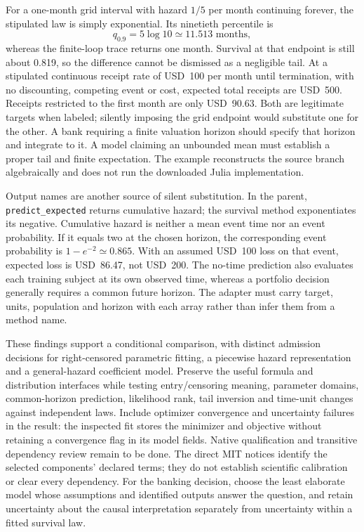 For a one-month grid interval with hazard $1/5$ per month continuing forever,
the stipulated law is simply exponential. Its ninetieth percentile is
\begin{equation}
 q_{0.9}=5\log 10\simeq11.513\text{ months},
 \label{rel22:tail-quantile}
\end{equation}
whereas the finite-loop trace returns one month. Survival at that endpoint
is still about 0.819, so the difference cannot be dismissed as a negligible
tail. At a stipulated continuous receipt rate of USD~100 per month until
termination, with no discounting, competing event or cost, expected total
receipts are USD~500. Receipts restricted to the first month are only
USD~90.63. Both are legitimate targets when labeled; silently imposing the
grid endpoint would substitute one for the other. A bank requiring a finite
valuation horizon should specify that horizon and integrate to it. A model
claiming an unbounded mean must establish a proper tail and finite expectation.
The example reconstructs the source branch algebraically and does not run the
downloaded Julia implementation. \citep{rel22survdist,rel22survwitness}

Output names are another source of silent substitution. In the parent,
\texttt{predict\_expected} returns cumulative hazard; the survival method
exponentiates its negative. Cumulative hazard is neither a mean event time nor
an event probability. If it equals two at the chosen horizon, the corresponding
event probability is $1-e^{-2}\simeq0.865$. With an assumed USD~100 loss on
that event, expected loss is USD~86.47, not USD~200. The no-time prediction
also evaluates each training subject at its own observed time, whereas a
portfolio decision generally requires a common future horizon. The adapter
must carry target, units, population and horizon with each array rather than
infer them from a method name. \citep{rel22survcaller,rel22survwitness}

These findings support a conditional comparison, with distinct admission
decisions for right-censored parametric fitting, a piecewise hazard
representation and a general-hazard coefficient model. Preserve the useful
formula and distribution interfaces while testing entry/censoring meaning,
parameter domains, common-horizon prediction, likelihood rank, tail inversion
and time-unit changes against independent laws. Include optimizer convergence
and uncertainty failures in the result: the inspected fit stores the minimizer
and objective without retaining a convergence flag in its model fields.
Native qualification and transitive dependency review remain to be done.
The direct MIT notices identify the selected components' declared terms;
they do not establish scientific calibration or clear every dependency.
For the banking decision, choose the least elaborate model whose assumptions
and identified outputs answer the question, and retain uncertainty about the
causal interpretation separately from uncertainty within a fitted survival law.
\citep{rel22survbase,rel22survdist,rel22survcaller}


